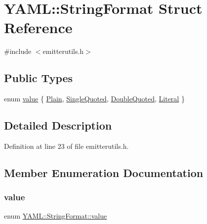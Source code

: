 \hypertarget{struct_y_a_m_l_1_1_string_format}{}\section{Y\+A\+ML\+::String\+Format Struct Reference}
\label{struct_y_a_m_l_1_1_string_format}


{\ttfamily \#include $<$emitterutils.\+h$>$}

\subsection*{Public Types}
\begin{DoxyCompactItemize}
\item 
enum \mbox{\hyperlink{struct_y_a_m_l_1_1_string_format_aa87d77d0f60417355a95432f16b226e0}{value}} \{ \mbox{\hyperlink{struct_y_a_m_l_1_1_string_format_aa87d77d0f60417355a95432f16b226e0a1acb6d9f22e9a26fc8bdf6d4d3f2a291}{Plain}}, 
\mbox{\hyperlink{struct_y_a_m_l_1_1_string_format_aa87d77d0f60417355a95432f16b226e0a9239ecee1bea2c454886f3ff33dff1bf}{Single\+Quoted}}, 
\mbox{\hyperlink{struct_y_a_m_l_1_1_string_format_aa87d77d0f60417355a95432f16b226e0a20f25b7a5f9aae417942864c443eee42}{Double\+Quoted}}, 
\mbox{\hyperlink{struct_y_a_m_l_1_1_string_format_aa87d77d0f60417355a95432f16b226e0aaa343dc874f7d5880896c0c43db32f52}{Literal}}
 \}
\end{DoxyCompactItemize}


\subsection{Detailed Description}


Definition at line 23 of file emitterutils.\+h.



\subsection{Member Enumeration Documentation}
\mbox{\label{struct_y_a_m_l_1_1_string_format_aa87d77d0f60417355a95432f16b226e0}} 
\subsubsection{\texorpdfstring{value}{value}}
{\footnotesize\ttfamily enum \mbox{\hyperlink{struct_y_a_m_l_1_1_string_format_aa87d77d0f60417355a95432f16b226e0}{Y\+A\+M\+L\+::\+String\+Format\+::value}}}

